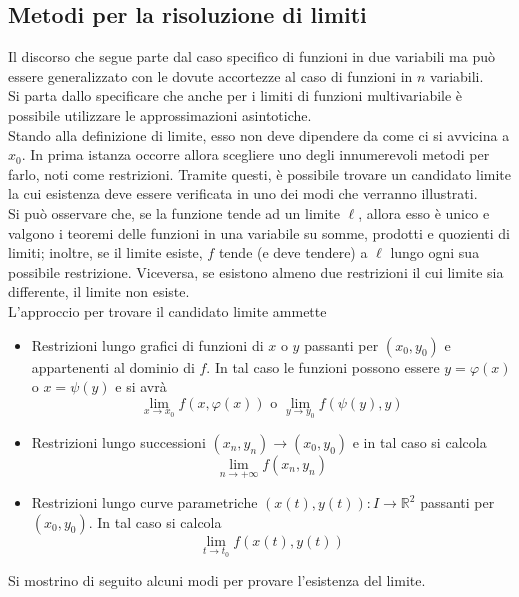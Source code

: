 \subsection{Metodi per la risoluzione di limiti}
Il discorso che segue parte dal caso specifico di funzioni in due variabili ma può essere generalizzato con le dovute accortezze al caso di funzioni in $n$ variabili.\\
Si parta dallo specificare che anche per i limiti di funzioni multivariabile è possibile utilizzare le approssimazioni asintotiche.\\
Stando alla definizione di limite, esso non deve dipendere da come ci si avvicina a $x_0$. In prima istanza occorre allora scegliere uno degli innumerevoli metodi per farlo, noti come restrizioni. Tramite questi, è possibile trovare un candidato limite la cui esistenza deve essere verificata in uno dei modi che verranno illustrati.\\
Si può osservare che, se la funzione tende ad un limite $\ell$, allora esso è unico e valgono i teoremi delle funzioni in una variabile su somme, prodotti e quozienti di limiti; inoltre, se il limite esiste, $f$ tende (e deve tendere) a $\ell$ lungo ogni sua possibile restrizione. Viceversa, se esistono almeno due restrizioni il cui limite sia differente, il limite non esiste.\\
L'approccio per trovare il candidato limite ammette
\begin{itemize}
    \item Restrizioni lungo grafici di funzioni di $x$ o $y$ passanti per $(x_0, y_0)$ e appartenenti al dominio di $f$. In tal caso le funzioni possono essere $y= \varphi(x)$ o $x=\psi(y)$ e si avrà
    \begin{equation*}
    \lim_{x \to x_0} f(x, \varphi(x)) \text{ o } \lim_{y \to y_0}{f(\psi(y), y)}
    \end{equation*}
    \item Restrizioni lungo successioni $(x_n, y_n) \to (x_0, y_0)$ e in tal caso si calcola
    \begin{equation*}
        \lim_{n \to +\infty}{f(x_n,y_n)}
    \end{equation*}
    \item Restrizioni lungo curve parametriche $(x(t), y(t)): I \to \mathbb{R}^2$ passanti per $(x_0, y_0)$. In tal caso si calcola
    \begin{equation*}
        \lim_{t \to t_0}{f(x(t), y(t))}
    \end{equation*}
\end{itemize}
Si mostrino di seguito alcuni modi per provare l'esistenza del limite.
